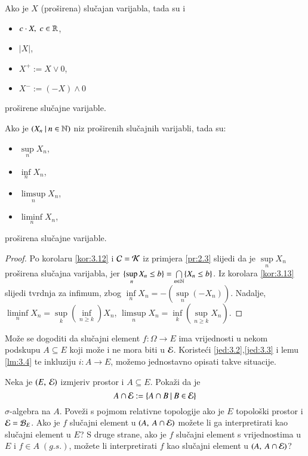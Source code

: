 \begin{kor} \label{kor:3.13}
    Ako je $X$ (pro\v sirena) slu\v cajan varijabla, tada su i
    \begin{itemize}[label=]
        \item $c \cdot X, \; c \in \mathbb{R}$,
        \item $|X|$,
        \item $X^+ := X \lor 0$,
        \item $X^- := (-X) \land 0$
    \end{itemize}
    pro\v sirene slu\v cajne varijable.
\end{kor}

\begin{kor} \label{kor:3.14}
    Ako je $({X_n} \: | \: {n \in \mathbb{N}})$ niz pro\v sirenih slu\v cajnih varijabli, tada su:
    \begin{itemize}[label=]
        \item $\sup\limits_{n} X_n$,
        \item $\inf\limits_{n} X_n$,
        \item $\limsup\limits_{n} X_n$,
        \item $\liminf\limits_{n} X_n$,
    \end{itemize}
    pro\v sirena slu\v cajne varijable.
\end{kor}

\begin{proof}
    Po korolaru \ref{kor:3.12} i $\mathcal{C} = \mathcal{K}$ iz primjera \ref{pr:2.3} slijedi da je $\sup\limits_n X_n$ pro\v sirena slu\v cajna varijabla, jer $\{ \sup\limits_n X_n \leq b \} = \bigcap\limits_{n \in \mathbb{N}}^{} \{ X_n \leq b \}$.
    Iz korolara \ref{kor:3.13} slijedi tvrdnja za infimum, zbog $\inf\limits_n X_n = - (\sup\limits_n (- X_n))$.
    Nadalje, $\liminf\limits_n X_n = \sup\limits_k (\inf\limits_{n \geq k}) X_n$, $\limsup\limits_n X_n = \inf\limits_k (\sup\limits_{n\geq k} X_n)$.
\end{proof}

Mo\v ze se dogoditi da slu\v cajni element $f:\Omega \to E$ ima vrijednosti u nekom podskupu $A \subseteq E$ koji mo\v ze i ne mora biti u $\mathcal{E}$. Koriste\' ci \eqref{jed:3.2},\eqref{jed:3.3} i lemu \ref{lm:3.4} te inkluziju $i: A \to E$, mo\v zemo jednostavno opisati takve situacije.

\begin{zad} \label{zad:3.15}
    Neka je $(E, \: \mathcal{E})$ izmjeriv prostor i $A \subseteq E$.
    Poka\v zi da je
    \begin{equation*}
        A \cap \mathcal{E} := \{{A \cap B} \: | \: {B \in \mathcal{E}}\}
    \end{equation*}
    $\sigma$-algebra na $A$.
    Pove\v zi s pojmom relativne topologije ako je $E$ topolo\v ski prostor i $\mathcal{E} = \mathcal{B}_{E}$.
    Ako je $f$ slu\v cajni element u $(A, \: A \cap \mathcal{E})$ mo\v zete li ga interpretirati kao slu\v cajni element u $E$?
    S druge strane, ako je $f$ slu\v cajni element s vrijednostima u $E$ i $f \in A \; (g.s.)$, mo\v zete li interpretirati $f$ kao slu\v cajni element u $({A}, \: {A \cap \mathcal{E}})$?
\end{zad}

